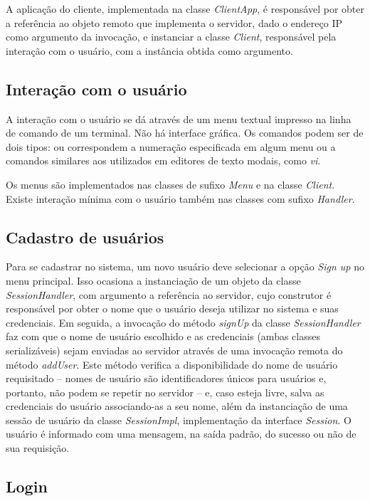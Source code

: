 \documentclass[../main.tex]{subfiles}
\begin{document}
A aplicação do cliente, implementada na classe \textit{ClientApp}, é responsável por obter a referência ao objeto remoto que implementa o servidor, dado o endereço IP como argumento da invocação, e instanciar a classe \textit{Client}, responsável pela interação com o usuário, com a instância obtida como argumento.

\subsection{Interação com o usuário}

A interação com o usuário se dá através de um menu textual impresso na linha de comando de um terminal.
Não há interface gráfica.
Os comandos podem ser de dois tipos: ou correspondem a numeração especificada em algum menu ou a comandos similares aos utilizados em editores de texto modais, como \textit{vi}.

Os menus são implementados nas classes de sufixo \textit{Menu} e na classe \textit{Client}.
Existe interação mínima com o usuário também nas classes com sufixo \textit{Handler}.

\subsection{Cadastro de usuários} \label{subsec:signup}

Para se cadastrar no sistema, um novo usuário deve selecionar a opção \textit{Sign up} no menu principal.
Isso ocasiona a instanciação de um objeto da classe \textit{SessionHandler}, com argumento a referência ao servidor, cujo construtor é responsável por obter o nome que o usuário deseja utilizar no sistema e suas credenciais.
Em seguida, a invocação do método \textit{signUp} da classe \textit{SessionHandler} faz com que o nome de usuário escolhido e as credenciais (ambas classes serializáveis) sejam enviadas ao servidor através de uma invocação remota do método \textit{addUser}.
Este método verifica a disponibilidade do nome de usuário requisitado -- nomes de usuário são identificadores únicos para usuários e, portanto, não podem se repetir no servidor -- e, caso esteja livre, salva as credenciais do usuário associando-as a seu nome, além da instanciação de uma sessão de usuário da classe \textit{SessionImpl}, implementação da interface \textit{Session}.
O usuário é informado com uma mensagem, na saída padrão, do sucesso ou não de sua requisição.

\subsection{Login}
\end{document}
